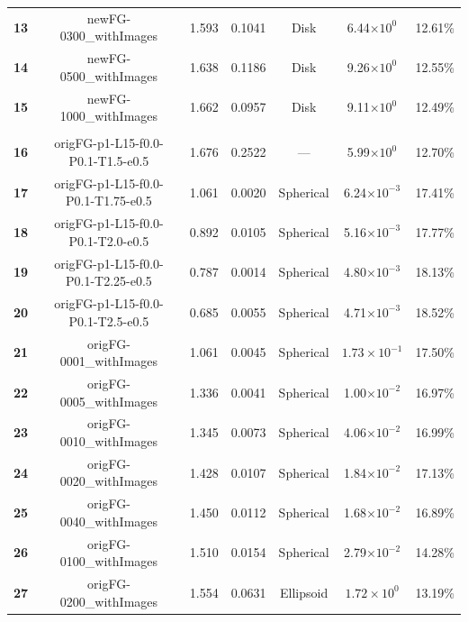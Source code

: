 \documentclass[12pt]{article}
\def\ccg{\cellcolor{gray}}
\begin{document}
\begin{center}
\begin{adjustbox}{max width=\textwidth}
\begin{tabular}{| c | c | c | c | c | c | c |}
\textbf{13}&\rule{0pt}{2.5ex}newFG-0300\_withImages&1.593&0.1041&Disk&6.44$\times 10^{0}$&12.61\%\\
{\ccg}\textbf{14}&{\ccg}\rule{0pt}{2.5ex}newFG-0500\_withImages&{\ccg} 1.638&{\ccg} 0.1186&{\ccg} Disk&{\ccg}9.26$\times 10^{0}$&{\ccg}12.55\%\\
\textbf{15}&\rule{0pt}{2.5ex}newFG-1000\_withImages&1.662&0.0957&Disk&9.11$\times 10^{0}$&12.49\%\\
\hhline{|=======|}
\multicolumn{7}{| c |}{{\ccg}OrigFG Runs}\\
\hhline{|=======|}
\textbf{16}&\rule{0pt}{2.5ex}origFG-p1-L15-f0.0-P0.1-T1.5-e0.5&1.676&0.2522&---&5.99$\times 10^{0}$&12.70\%\\
{\ccg}\textbf{17}&{\ccg}\rule{0pt}{2.5ex}origFG-p1-L15-f0.0-P0.1-T1.75-e0.5&{\ccg} 1.061&{\ccg} 0.0020&{\ccg} Spherical&{\ccg} 6.24$\times 10^{-3}$&{\ccg} 17.41\%\\
\textbf{18}&\rule{0pt}{2.5ex}origFG-p1-L15-f0.0-P0.1-T2.0-e0.5&0.892&0.0105&Spherical&5.16$\times 10^{-3}$&17.77\%\\
{\ccg}\textbf{19}&{\ccg}\rule{0pt}{2.5ex}origFG-p1-L15-f0.0-P0.1-T2.25-e0.5&{\ccg} 0.787&{\ccg} 0.0014&{\ccg} Spherical&{\ccg} 4.80$\times 10^{-3}$&{\ccg} 18.13\%\\
\textbf{20}&\rule{0pt}{2.5ex}origFG-p1-L15-f0.0-P0.1-T2.5-e0.5&0.685&0.0055&Spherical&4.71$\times 10^{-3}$&18.52\%\\
\hhline{|=======|}
{\ccg}\textbf{21}&{\ccg}\rule{0pt}{2.5ex}origFG-0001\_withImages&{\ccg} 1.061&{\ccg} 0.0045&{\ccg} Spherical&{\ccg} $1.73\times 10^{-1}$&{\ccg} 17.50\%\\
\textbf{22}&\rule{0pt}{2.5ex}origFG-0005\_withImages&1.336&0.0041&Spherical&1.00$\times 10^{-2}$&16.97\%\\
{\ccg}\textbf{23}&{\ccg}\rule{0pt}{2.5ex}origFG-0010\_withImages&{\ccg} 1.345&{\ccg} 0.0073&{\ccg} Spherical&{\ccg} 4.06$\times 10^{-2}$&{\ccg} 16.99\%\\
\textbf{24}&\rule{0pt}{2.5ex}origFG-0020\_withImages&1.428&0.0107&Spherical&1.84$\times 10^{-2}$&17.13\%\\
{\ccg}\textbf{25}&{\ccg}\rule{0pt}{2.5ex}origFG-0040\_withImages&{\ccg} 1.450&{\ccg} 0.0112&{\ccg} Spherical&{\ccg} 1.68$\times 10^{-2}$&{\ccg} 16.89\%\\
\textbf{26}&\rule{0pt}{2.5ex}origFG-0100\_withImages&1.510&0.0154&Spherical&2.79$\times 10^{-2}$&14.28\%\\
{\ccg}\textbf{27}&{\ccg}\rule{0pt}{2.5ex}origFG-0200\_withImages&{\ccg} 1.554&{\ccg} 0.0631&{\ccg} Ellipsoid&{\ccg} $1.72\times 10^{0}$&{\ccg} 13.19\%\\

\end{tabular}
\end{adjustbox}
\end{center}
\end{document}

